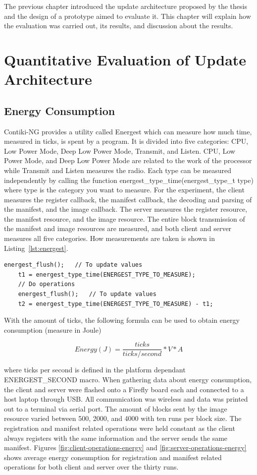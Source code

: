 \documentclass[0-thesis.tex]{subfiles}
\begin{document}
The previous chapter introduced the update architecture proposed by the thesis and the
design of a prototype aimed to evaluate it. This chapter will explain how the evaluation
was carried out, its results, and discussion about the results.

\section{Quantitative Evaluation of Update Architecture}
\label{sec:quant-evaluation}


\subsection{Energy Consumption}
\label{ssec:energy-consumption}
Contiki-NG provides a utility called Energest which can measure how much time, measured in
ticks, is spent by a program. It is divided into five categories: CPU, Low Power Mode,
Deep Low Power Mode, Transmit, and Listen. CPU, Low Power Mode, and Deep Low Power Mode
are related to the work of the processor while Transmit and Listen measures the radio.
Each type can be measured independently by calling the function
energest\_type\_time(energest\_type\_t type) where type is the category you want to
measure. For the experiment, the client measures the register callback, the manifest
callback, the decoding and parsing of the manifest, and the image callback. The server
measures the register resource, the manifest resource, and the image resource. The entire
block transmission of the manifest and image resources are measured, and both client and
server measures all five categories. How measurements are taken is shown in
Listing~\ref{lst:energest}.

\begin{lstlisting}[language=manifest, caption={How to measure ticks in energest.}, label=lst:energest]
    energest_flush();   // To update values
    t1 = energest_type_time(ENERGEST_TYPE_TO_MEASURE);
    // Do operations
    energest_flush();   // To update values
    t2 = energest_type_time(ENERGEST_TYPE_TO_MEASURE) - t1;
\end{lstlisting}

With the amount of ticks, the following formula can be used to obtain energy consumption
(measure in Joule)

$$ Energy (J) = \frac{ticks}{ticks/second} * V * A $$

where ticks per second is defined in the platform dependant ENERGEST\_SECOND macro. When
gathering data about energy consumption, the client and server were flashed onto a Firefly
board each and connected to a host laptop through USB. All communication was wireless and
data was printed out to a terminal via serial port. The amount of blocks sent by the image
resource varied between 500, 2000, and 4000 with ten runs per block size. The registration
and manifest related operations were held constant as the client always registers with the
same information and the server sends the same manifest. Figures
\ref{fig:client-operations-energy} and \ref{fig:server-operations-energy} shows average
energy consumption for registration and manifest related operations for both client and
server over the thirty runs.
\end{document}
